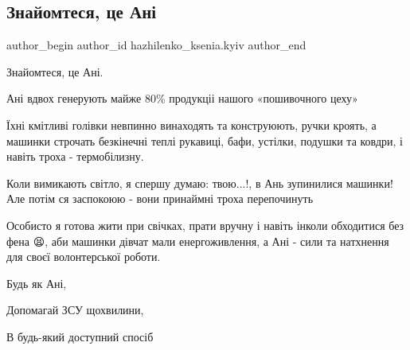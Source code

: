 
 
 
 
 
 
\subsection{Знайомтеся, це Ані}
\label{sec:18_10_2022.fb.hazhilenko_ksenia.kyiv.1.ce_ani}
 
\ifcmt
 author_begin
   author_id hazhilenko_ksenia.kyiv
 author_end
\fi

Знайомтеся, це Ані.

Ані вдвох генерують майже 80\% продукціі нашого «пошивочного цеху»

Їхні кмітливі голівки невпинно винаходять та конструюють, ручки кроять, а
машинки строчать безкінечні теплі рукавиці, бафи, устілки, подушки та ковдри, і
навіть троха - термобілизну.

Коли вимикають світло, я спершу думаю: твою...!, в Ань зупинилися машинки! Але
потім ся заспокоюю - вони принаймні троха перепочинуть

Особисто я готова жити при свічках, прати вручну і навіть інколи обходитися без
фена 😫, аби машинки дівчат мали енергоживлення, а Ані - сили та натхнення для
своєї волонтерської роботи.

Будь як Ані,

Допомагай ЗСУ щохвилини,

В будь-який доступний спосіб

